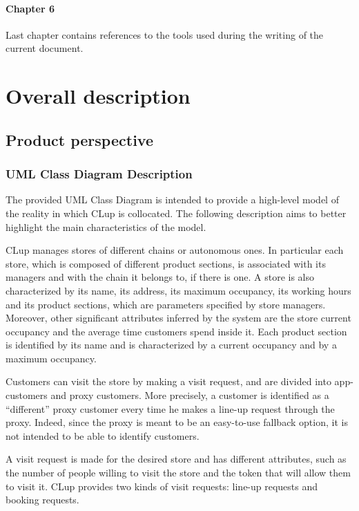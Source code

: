 \documentclass[a4paper,oneside,11pt]{book}   %
\begin{document}
    \subsubsection{Chapter 6}
    Last chapter contains references to the tools used during the writing of the current document.


\chapter{Overall description}
    \section{Product perspective}
    \subsection{UML Class Diagram Description}
    The provided UML Class Diagram is intended to provide a high-level model of the reality in which CLup is collocated. The following description aims to better highlight the main characteristics of the model. \par
    CLup manages stores of different chains or autonomous ones. In particular each store, which is composed of different product sections, is associated with its managers and with the chain it belongs to, if there is one. A store is also characterized by its name, its address, its maximum occupancy, its working hours and its product sections, which are parameters specified by store managers. Moreover, other significant attributes inferred by the system are the store current occupancy and the average time customers spend inside it. Each product section is identified by its name and is characterized by a current occupancy and by a maximum occupancy. \par
    Customers can visit the store by making a visit request, and are divided into app-customers and proxy customers. More precisely, a customer is identified as a “different” proxy customer every time he makes a line-up request through the proxy. Indeed, since the proxy is meant to be an easy-to-use fallback option, it is not intended to be able to identify customers. \par
    A visit request is made for the desired store and has different attributes, such as the number of people willing to visit the store and the token that will allow them to visit it. CLup provides two kinds of visit requests: line-up requests and booking requests. \par
\end{document}
